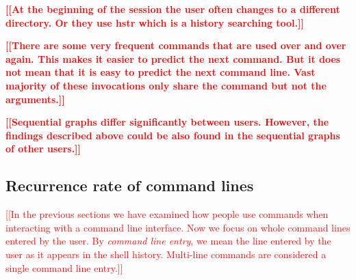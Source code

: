 \documentclass[thesis=M,english]{FITthesis}[2012/10/20]
\newcommand{\todotext}[1]{\textcolor{red}{\textbf{[[#1]]}}}
\newcommand{\redtext}[1]{\textcolor{red}{[[#1]]}}
\let\myCite\cite
\renewcommand\cite{\unskip~\myCite}
\begin{document}
\todotext{At the beginning of the session the user often changes to a different directory. Or they use hstr which is a history searching tool.}

\todotext{There are some very frequent commands that are used over and over again. This makes it easier to predict the next command. But it does not mean that it is easy to predict the next command line. Vast majority of these invocations only share the command but not the arguments.}

\todotext{Sequential graphs differ significantly between users. However, the findings described above could be also found in the sequential graphs of other users.}








\subsection{Recurrence rate of command lines}

\redtext{In the previous sections we have examined how people use commands when interacting with a command line interface. Now we focus on whole command lines entered by the user. By \textit{command line entry}, we mean the line entered by the user as it appears in the shell history. Multi-line commands are considered a single command line entry.} 
\end{document}
